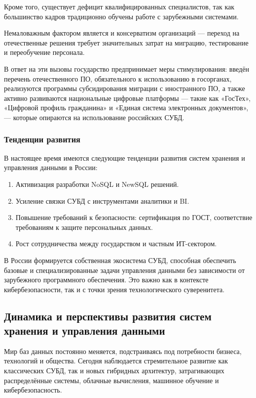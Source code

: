 Кроме того, существует дефицит квалифицированных специалистов, так как большинство кадров традиционно обучены работе с зарубежными системами.

Немаловажным фактором является и консерватизм организаций — переход на отечественные решения требует значительных затрат на миграцию, тестирование и переобучение персонала. 

В ответ на эти вызовы государство предпринимает меры стимулирования: введён перечень отечественного ПО, обязательного к использованию в госорганах, реализуются программы субсидирования миграции с иностранного ПО, а также активно развиваются национальные цифровые платформы — такие как «ГосТех», «Цифровой профиль гражданина» и «Единая система электронных документов», — которые опираются на использование российских СУБД.

\subsubsection{Тенденции развития}

В настоящее время имеются следующие тенденции развития систем хранения и управления данными в России:

\begin{enumerate}
	\item Активизация разработки NoSQL и NewSQL решений.
	\item Усиление связки СУБД с инструментами аналитики и BI.
	\item Повышение требований к безопасности: сертификация по ГОСТ, соответствие требованиям к защите персональных данных.
	\item Рост сотрудничества между государством и частным ИТ-сектором.	
\end{enumerate}

В России формируется собственная экосистема СУБД, способная обеспечить базовые и специализированные задачи управления данными без зависимости от зарубежного программного обеспечения. Это важно как в контексте кибербезопасности, так и с точки зрения технологического суверенитета.

\subsection{Динамика и перспективы развития систем хранения и управления данными}

Мир баз данных постоянно меняется, подстраиваясь под потребности бизнеса, технологий и общества. Сегодня наблюдается стремительное развитие как классических СУБД, так и новых гибридных архитектур, затрагивающих распределённые системы, облачные вычисления, машинное обучение и кибербезопасность.

